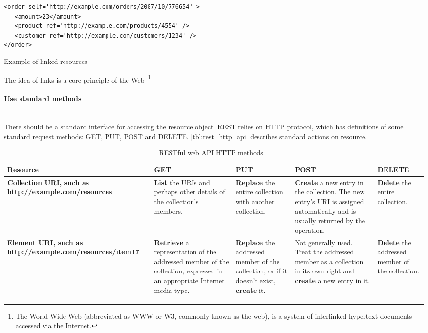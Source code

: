 \begin{listing}[H]
\begin{verbatim}
<order self='http://example.com/orders/2007/10/776654' > 
   <amount>23</amount> 
   <product ref='http://example.com/products/4554' /> 
   <customer ref='http://example.com/customers/1234' /> 
</order> 
\end{verbatim}
\caption{Example of linked resources~\cite{rest_brief_intro}}
\label{lst:linked_uri_example}
\end{listing}
 
The idea of links is a core principle of the Web~\footnote{The World Wide Web
(abbreviated as WWW or W3, commonly known as the web), is a system of
interlinked hypertext documents accessed via the Internet.\cite{wikipedia:WWW}}

\paragraph{Use standard methods} ~\\

There should be a standard interface for accessing the resource object.
REST relies on HTTP protocol, which has definitions of some standard request
methods:
GET, PUT, POST and DELETE.
\autoref{tbl:rest_http_api} describes standard actions on resource.

\begin{table}[h]
	\centering	
	\caption{RESTful web API HTTP methods ~\cite{wikipedia:REST}}
	\label{tbl:rest_http_api}
	\begin{tabularx}{\textwidth}{|X|X|X|X|X|}
		\hline
		\textbf{Resource} & 
		\textbf{GET}  	& 
		\textbf{PUT} 	&
		\textbf{POST} &
		\textbf{DELETE}
	    
	    \tabularnewline
		\hline
			\begin{sloppypar}
				\textbf{Collection URI, such as \url{http://example.com/resources}}
			\end{sloppypar} &
			\textbf{List} the URIs and perhaps other details of the collection's members.&
			\textbf{Replace} the entire collection with another collection.&
			\textbf{Create} a new entry in the collection. The new entry's URI is
			assigned automatically and is usually returned by the operation. &
			\textbf{Delete} the entire collection.
			
	    	\tabularnewline	    	
	    	\hline
	    	\begin{sloppypar}
				\textbf{Element URI, such as \url{http://example.com/resources/item17}} 
			\end{sloppypar} &
			\textbf{Retrieve} a representation of the addressed member of the
			collection, expressed in an appropriate Internet media type. &
			\textbf{Replace} the addressed member of the collection, or if it
			doesn't exist, \textbf{create} it. &			
			Not generally used. Treat the addressed member as a collection in its own
			right and \textbf{create} a new entry in it. &			
			\textbf{Delete} the addressed member of the collection.
	
	    \tabularnewline
		\hline	  
	\end{tabularx} 
	
\end{table}

